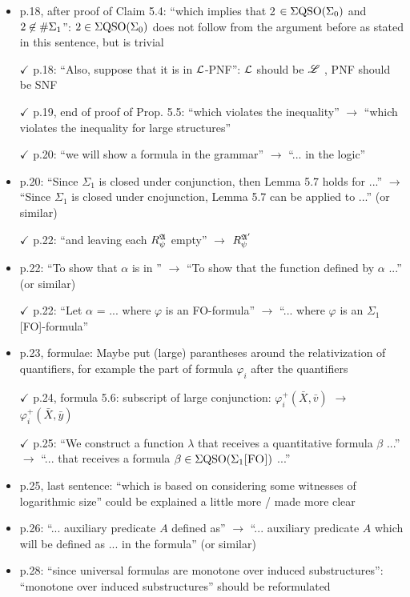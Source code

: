\begin{itemize}
\item p.18, after proof of Claim 5.4: ``which implies that 2 $\in \Sigma{\rm QSO}(\Sigma_0)$ and $2 \not\in \#\Sigma_{1}$'': $2 \in \Sigma{\rm QSO}(\Sigma_0)$
does not follow from the argument before as stated in this sentence, but is trivial
\item[$\checkmark$] p.18: ``Also, suppose that it is in $\mathcal{L}$-PNF'': $\mathcal{L}$ should be $\mathscr{L}$ , PNF should be SNF
\item[$\checkmark$] p.19, end of proof of Prop. 5.5: ``which violates the inequality'' $\to$ ``which violates the inequality
for large structures''
\item[$\checkmark$] p.20: ``we will show a formula in the grammar'' $\to$ ``... in the logic''
\item p.20: ``Since $\Sigma_1$ is closed under conjunction, then Lemma 5.7 holds for ...'' $\to$ ``Since $\Sigma_1$ is
closed under cnojunction, Lemma 5.7 can be applied to ...'' (or similar)
\item[$\checkmark$] p.22: ``and leaving each $R_{\psi}^{\mathfrak{A}}$ empty'' $\to$ $R_{\psi}^{\mathfrak{A}'}$
\item p.22: ``To show that $\alpha$ is in \totp'' $\to$ ``To show that the function defined by $\alpha$ ...'' (or similar)
\item[$\checkmark$] p.22: ``Let $\alpha$ = ... where $\varphi$ is an FO-formula'' $\to$ ``... where $\varphi$ is an $\Sigma_1$[FO]-formula''
\item p.23, formulae: Maybe put (large) parantheses around the relativization of quantifiers, for
example the part of formula $\varphi_i$ after the quantifiers
\item[$\checkmark$] p.24, formula 5.6: subscript of large conjunction: $\varphi_i^{+}(\bar{X},\bar{v})$ $\to$ $\varphi_i^{+}(\bar{X},\bar{y})$
\item[$\checkmark$] p.25: ``We construct a function $\lambda$ that receives a quantitative formula $\beta$ ...'' $\to$ ``... that receives
a formula $\beta \in \Sigma{\rm QSO}(\Sigma_{1}\textsc{[FO]})$ ...''
\item p.25, last sentence: ``which is based on considering some witnesses of logarithmic size'' could
be explained a little more / made more clear
\item p.26: ``... auxiliary predicate $A$ defined as'' $\to$ ``... auxiliary predicate $A$ which will be defined
as ... in the formula'' (or similar)
\item p.28: ``since universal formulas are monotone over induced substructures'': ``monotone over
induced substructures'' should be reformulated

\end{itemize}
